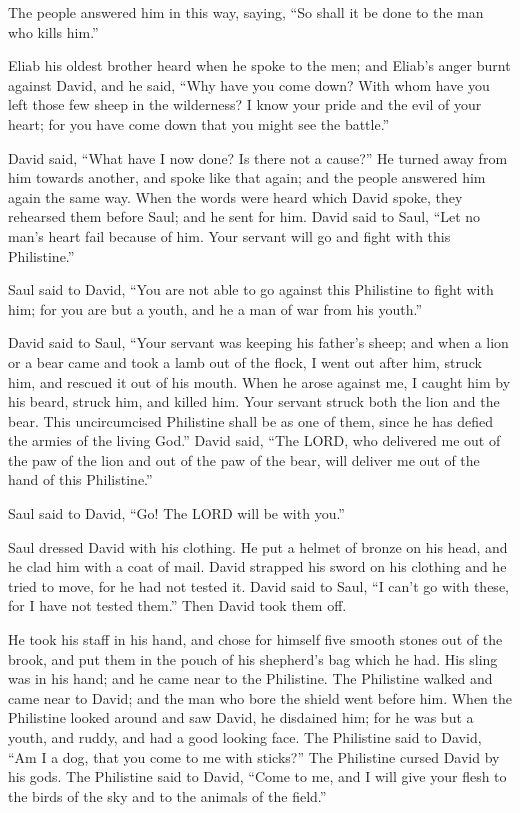  The people answered him in this way, saying, ``So shall
it be done to the man who kills him.''

 Eliab his oldest brother heard when he spoke to the men;
and Eliab's anger burnt against David, and he said, ``Why have you come
down? With whom have you left those few sheep in the wilderness? I know
your pride and the evil of your heart; for you have come down that you
might see the battle.''

 David said, ``What have I now done? Is there not a
cause?''  He turned away from him towards another, and
spoke like that again; and the people answered him again the same way.
 When the words were heard which David spoke, they
rehearsed them before Saul; and he sent for him.  David
said to Saul, ``Let no man's heart fail because of him. Your servant
will go and fight with this Philistine.''

 Saul said to David, ``You are not able to go against
this Philistine to fight with him; for you are but a youth, and he a man
of war from his youth.''

 David said to Saul, ``Your servant was keeping his
father's sheep; and when a lion or a bear came and took a lamb out of
the flock,  I went out after him, struck him, and rescued
it out of his mouth. When he arose against me, I caught him by his
beard, struck him, and killed him.  Your servant struck
both the lion and the bear. This uncircumcised Philistine shall be as
one of them, since he has defied the armies of the living God.''
 David said, ``The LORD, who delivered me out of the paw
of the lion and out of the paw of the bear, will deliver me out of the
hand of this Philistine.''

Saul said to David, ``Go! The LORD will be with you.''

 Saul dressed David with his clothing. He put a helmet of
bronze on his head, and he clad him with a coat of mail. 
David strapped his sword on his clothing and he tried to move, for he
had not tested it. David said to Saul, ``I can't go with these, for I
have not tested them.'' Then David took them off.

 He took his staff in his hand, and chose for himself
five smooth stones out of the brook, and put them in the pouch of his
shepherd's bag which he had. His sling was in his hand; and he came near
to the Philistine.  The Philistine walked and came near
to David; and the man who bore the shield went before him.
 When the Philistine looked around and saw David, he
disdained him; for he was but a youth, and ruddy, and had a good looking
face.  The Philistine said to David, ``Am I a dog, that
you come to me with sticks?'' The Philistine cursed David by his gods.
 The Philistine said to David, ``Come to me, and I will
give your flesh to the birds of the sky and to the animals of the
field.''

